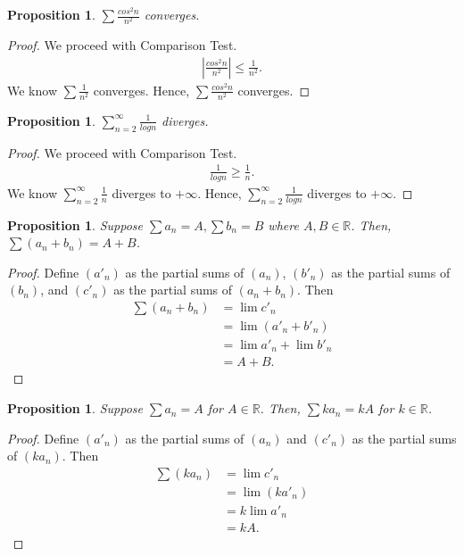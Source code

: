 \documentclass{article}
\newtheorem{proposition}[thm]{Proposition}
\begin{document}
\newpage
\begin{proposition}
    $\sum\frac{cos^2n}{n^2}$ converges.
\end{proposition}
\begin{proof}
    We proceed with Comparison Test.
    \begin{align*}
        \left|\frac{cos^2n}{n^2}\right| \le \frac{1}{n^2}.
    \end{align*}
    We know $\sum\frac{1}{n^2}$ converges. Hence, $\sum\frac{cos^2n}{n^2}$ converges.
\end{proof}

\begin{proposition}
    $\sum_{n=2}^{\infty}\frac{1}{log n}$ diverges.
\end{proposition}
\begin{proof}
    We proceed with Comparison Test.
    \begin{align*}
        \frac{1}{log n} \ge \frac{1}{n}.
    \end{align*}
    We know $\sum_{n=2}^\infty\frac{1}{n}$ diverges to $+\infty$. Hence, 
    $\sum_{n=2}^\infty\frac{1}{log n}$ diverges to $+\infty$.
\end{proof}

\begin{proposition}
    Suppose $\sum a_n=A, \sum b_n=B$  where $A, B \in \mathbb{R}$. Then, $\sum (a_n+b_n)=A+B$.
\end{proposition}
\begin{proof}
    Define $(a'_n)$ as the partial sums of $(a_n)$, $(b'_n)$ as the partial sums of $(b_n)$, and 
    $(c'_n)$ as the partial sums of $(a_n+b_n)$. 
    Then
    \begin{align*}
        \sum(a_n+b_n) & = \lim c'_n \\
        & = \lim (a'_n + b'_n) \\
        & = \lim a'_n + \lim b'_n \\
        & = A + B.
    \end{align*}
\end{proof}

\begin{proposition}
    Suppose $\sum a_n=A$  for $A \in \mathbb{R}$. Then, $\sum ka_n=kA$ for 
    $k \in \mathbb{R}$.
\end{proposition}
\begin{proof}
    Define $(a'_n)$ as the partial sums of $(a_n)$ and 
    $(c'_n)$ as the partial sums of $(ka_n)$. 
    Then
    \begin{align*}
        \sum(ka_n) & = \lim c'_n \\
        & = \lim (ka'_n) \\
        & = k\lim a'_n \\
        & = kA.
    \end{align*}
\end{proof}
\end{document}
